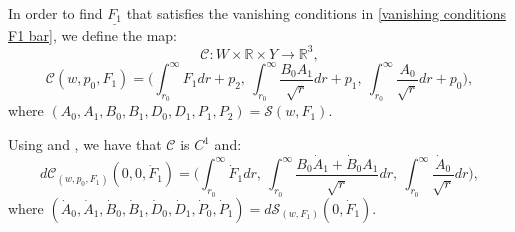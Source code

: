 \documentclass[11pt]{article}
\numberwithin{equation}{section}
\begin{document}
In order to find $\underline{F_1}$ that satisfies the vanishing conditions in \eqref{vanishing conditions F1 bar}, we define the map: 
\[\mathcal{C}:W\times\mathbb{R}\times Y\rightarrow\mathbb{R}^3,\] 
\[\mathcal{C}(w,p_0,F_1)=\bigg(\int_{r_0}^{\infty}F_1dr+p_2,\ \int_{r_0}^{\infty}\frac{B_0A_1}{\sqrt{r}}dr+p_1,\ \int_{r_0}^{\infty}\frac{A_0}{\sqrt{r}}dr+p_0\bigg),\]
where $(A_0,A_1,B_0,B_1,D_0,D_1,P_1,P_2)=\mathcal{S}(w,F_1)$. 

Using  and , we have that $\mathcal{C}$ is $C^1$ and:
\[d\mathcal{C}_{(w,p_0,F_1)}(0,0,\dot{F}_1)=\bigg(\int_{r_0}^{\infty}\dot{F}_1dr,\ \int_{r_0}^{\infty}\frac{B_0\dot{A}_1+\dot{B}_0A_1}{\sqrt{r}}dr,\ \int_{r_0}^{\infty}\frac{\dot{A}_0}{\sqrt{r}}dr\bigg),\]
where $(\dot{A}_0,\dot{A}_1,\dot{B}_0,\dot{B}_1,\dot{D}_0,\dot{D}_1,\dot{P}_0,\dot{P}_1)=d\mathcal{S}_{(w,F_1)}(0,\dot{F}_1).$
\end{document}
